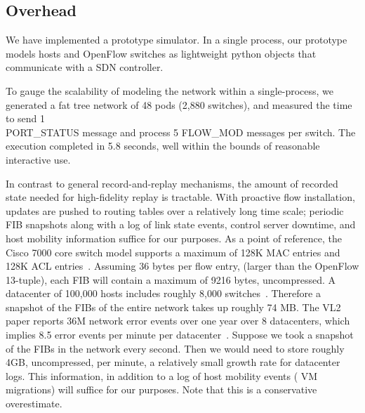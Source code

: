 \subsection{Overhead}

 We have implemented a prototype
simulator. In a single process, our prototype models hosts and OpenFlow switches 
as lightweight python objects that communicate with a SDN controller. 

To gauge the scalability of modeling the network within a single-process,
we generated a fat tree network of 48 pods (2,880 switches), and measured the
time to send 1 \\
PORT\_STATUS message and process 5 FLOW\_MOD
messages per switch. The execution completed in 5.8 seconds, well within the
bounds of reasonable interactive use.


 In contrast to general record-and-replay
mechanisms, the amount of recorded state needed for
high-fidelity replay is tractable. With proactive flow installation, 
updates are pushed to routing tables over a relatively long time scale; periodic
FIB snapshots along with a log of link state events, control server
downtime, and host mobility information suffice for our purposes. As a point of reference, the Cisco 7000 
core switch model supports a maximum of 128K MAC entries and
128K ACL entries~\cite{cisco7000}. Assuming 36 bytes per flow entry,
(larger than the OpenFlow 13-tuple), each FIB will contain a maximum of 9216
bytes, uncompressed. A datacenter of 100,000
hosts includes roughly 8,000
switches~\cite{Al-Fares:2008:SCD:1402958.1402967}.
Therefore a snapshot of the FIBs of the entire network takes up roughly 74 MB.
The VL2 paper reports 36M network error events over one year over 8
datacenters, which implies 8.5 error events per minute per
datacenter~\cite{Greenberg:2009:VSF:1592568.1592576}.
Suppose we took a snapshot of the FIBs in the network every second. 
Then we would need to store roughly 4GB, uncompressed, per minute, a relatively small growth 
rate for datacenter logs. This information, in addition to a log of host
mobility events (\eg{} VM migrations) will suffice for our purposes. Note that this is a conservative overestimate.

